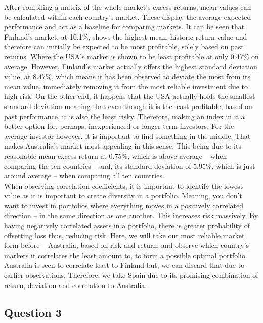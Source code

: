 \documentclass[11pt, english]{article}
\begin{document}
	After compiling a matrix of the whole market’s excess returns, mean values can be calculated within each country’s market. These display the average expected performance and act as a baseline for comparing markets. It can be seen that Finland’s market, at 10.1\%, shows the highest mean, historic return value and therefore can initially be expected to be most profitable, solely based on past returns. Where the USA’s market is shown to be least profitable at only 0.47\% on average. However, Finland’s market actually offers the highest standard deviation value, at 8.47\%, which means it has been observed to deviate the most from its mean value, immediately removing it from the most reliable investment due to high risk. On the other end, it happens that the USA actually holds the smallest standard deviation meaning that even though it is the least profitable, based on past performance, it is also the least risky. Therefore, making an index in it a better option for, perhaps, inexperienced or longer-term investors. For the average investor however, it is important to find something in the middle. That makes Australia’s market most appealing in this sense. This being due to its reasonable mean excess return at 0.75\%, which is above average – when comparing the ten countries – and, its standard deviation of 5.95\%, which is just around average – when comparing all ten countries.\\

	When observing correlation coefficients, it is important to identify the lowest value as it is important to create diversity in a portfolio. Meaning, you don’t want to invest in portfolios where everything moves in a positively correlated direction – in the same direction as one another. This increases risk massively. By having negatively correlated assets in a portfolio, there is greater probability of offsetting loss thus, reducing risk. Here, we will take our most reliable market form before – Australia, based on risk and return, and observe which country’s markets it correlates the least amount to, to form a possible optimal portfolio. Australia is seen to correlate least to Finland but, we can discard that due to earlier observations. Therefore, we take Spain due to its promising combination of return, deviation and correlation to Australia.

\newpage

	\subsection{Question 3}
\end{document}

